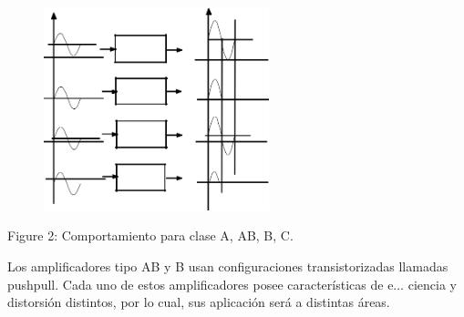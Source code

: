\documentclass[12pt]{article}
\begin{document}




\begin{figure}[H]
\advance\leftskip 1.68in		\includegraphics[width=2.57in,height=2.32in]{./media/image3.png}
\end{figure}



\par


\vspace{\baselineskip}

\vspace{\baselineskip}
\begin{adjustwidth}{0.0in}{0.01in}
\begin{Center}
Figure 2: Comportamiento para clase A, AB, B, C.
\end{Center}\par

\end{adjustwidth}


\vspace{\baselineskip}

\vspace{\baselineskip}
\begin{adjustwidth}{0.86in}{0.88in}
\begin{justify}
{\fontsize{9pt}{10.8pt}\selectfont Los amplificadores tipo AB y B usan configuraciones transistorizadas llamadas pushpull. Cada uno de estos amplificadores posee características de e$ \ldots $ ciencia y distorsión distintos, por lo cual, sus aplicación será a distintas áreas.\par}
\end{justify}\par

\end{adjustwidth}
\end{document}
